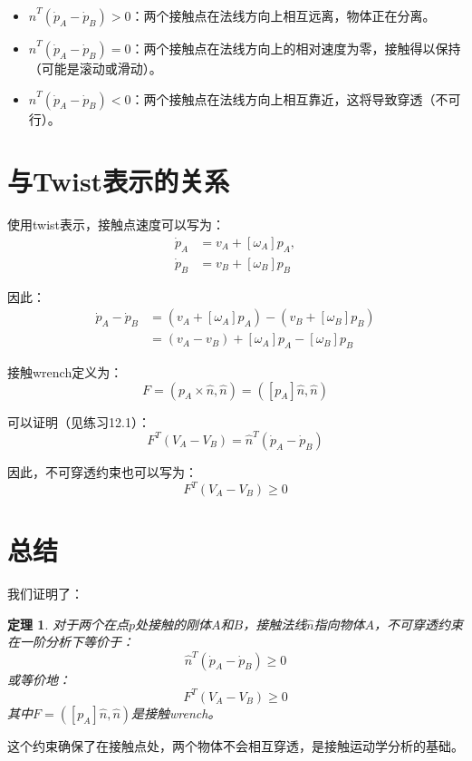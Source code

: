 \documentclass[12pt,a4paper]{article}
\newtheorem{theorem}{定理}
\begin{document}
\begin{itemize}
\item \textbf{$\hat{n}^T (\dot{p}_A - \dot{p}_B) > 0$}：两个接触点在法线方向上相互远离，物体正在分离。

\item \textbf{$\hat{n}^T (\dot{p}_A - \dot{p}_B) = 0$}：两个接触点在法线方向上的相对速度为零，接触得以保持（可能是滚动或滑动）。

\item \textbf{$\hat{n}^T (\dot{p}_A - \dot{p}_B) < 0$}：两个接触点在法线方向上相互靠近，这将导致穿透（不可行）。
\end{itemize}

\section{与Twist表示的关系}

使用twist表示，接触点速度可以写为：
\begin{align}
\dot{p}_A &= v_A + [\omega_A] p_A, \\
\dot{p}_B &= v_B + [\omega_B] p_B
\end{align}

因此：
\begin{align}
\dot{p}_A - \dot{p}_B &= (v_A + [\omega_A] p_A) - (v_B + [\omega_B] p_B) \\
&= (v_A - v_B) + [\omega_A] p_A - [\omega_B] p_B
\end{align}

接触wrench定义为：
\begin{equation}
F = (p_A \times \hat{n}, \hat{n}) = ([p_A]\hat{n}, \hat{n})
\end{equation}

可以证明（见练习12.1）：
\begin{equation}
F^T (V_A - V_B) = \hat{n}^T (\dot{p}_A - \dot{p}_B)
\end{equation}

因此，不可穿透约束也可以写为：
\begin{equation}
F^T (V_A - V_B) \geq 0
\label{eq:12.5}
\end{equation}

\section{总结}

我们证明了：

\begin{theorem}
对于两个在点$p$处接触的刚体$A$和$B$，接触法线$\hat{n}$指向物体$A$，不可穿透约束在一阶分析下等价于：
\begin{equation}
\hat{n}^T (\dot{p}_A - \dot{p}_B) \geq 0
\end{equation}
或等价地：
\begin{equation}
F^T (V_A - V_B) \geq 0
\end{equation}
其中$F = ([p_A]\hat{n}, \hat{n})$是接触wrench。
\end{theorem}

这个约束确保了在接触点处，两个物体不会相互穿透，是接触运动学分析的基础。
\end{document}
